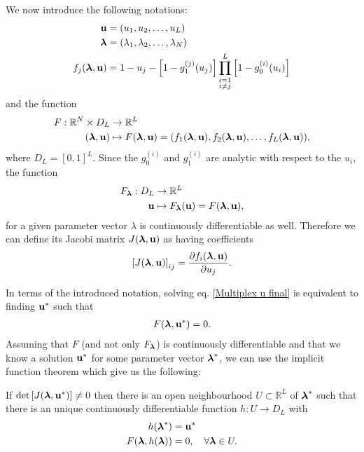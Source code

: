 \documentclass[a4paper]{article}
\begin{document}

We now introduce the following notations:
\begin{align}
	\boldsymbol{\mathrm{u}} &= (u_1, u_2, \dots, u_L) \\
	\boldsymbol{\mathrm{\lambda}} &= (\lambda_1, \lambda_2, \dots, \lambda_N) \\
	f_j(\boldsymbol{\mathrm{\lambda}}, \boldsymbol{\mathrm{u}}) &= 1 - u_j - \left[1 - g_1^{(j)}(u_j) \right] \prod_{\substack{i = 1 \\ i \neq j}}^{L}  \left[1 - g_0^{(i)}(u_i) \right] \label{Definition fj}
\end{align}
and the function
\begin{align}
	F : \mathbb{R}^N \times D_L &\rightarrow \mathbb{R}^L \\
	(\boldsymbol{\mathrm{\lambda}}, \boldsymbol{\mathrm{u}}) &\mapsto F(\boldsymbol{\mathrm{\lambda}}, \boldsymbol{\mathrm{u}}) = (f_1(\boldsymbol{\mathrm{\lambda}}, \boldsymbol{\mathrm{u}}), f_2(\boldsymbol{\mathrm{\lambda}}, \boldsymbol{\mathrm{u}}), \dots, f_L(\boldsymbol{\mathrm{\lambda}}, \boldsymbol{\mathrm{u}})), \label{Definition F}
\end{align}
where $D_L = [0, 1]^L$. Since the $g_0^{(i)}$ and $g_1^{(i)}$ are analytic with respect to the $u_i$, the function
\begin{align}
	F_{\boldsymbol{\mathrm{\lambda}}} : D_L &\rightarrow \mathbb{R}^L\\
		\boldsymbol{\mathrm{u}} &\mapsto F_{\boldsymbol{\mathrm{\lambda}}}(\boldsymbol{\mathrm{u}}) = F(\boldsymbol{\mathrm{\lambda}}, \boldsymbol{\mathrm{u}}),
\end{align}
for a given parameter vector $\lambda$ is continuously differentiable as well. Therefore we can define its Jacobi matrix $J(\boldsymbol{\mathrm{\lambda}}, \boldsymbol{\mathrm{u}})$ as having coefficients
\begin{align}
	\left[ J(\boldsymbol{\mathrm{\lambda}}, \boldsymbol{\mathrm{u}}) \right]_{ij} = \frac{\partial f_i(\boldsymbol{\mathrm{\lambda}},\boldsymbol{\mathrm{u}})}{\partial u_j}.
\end{align}

In terms of the introduced notation, solving eq. \eqref{Multiplex u final} is equivalent to finding $\boldsymbol{\mathrm{u}}^*$ such that
\begin{align}
	F(\boldsymbol{\mathrm{\lambda}}, \boldsymbol{\mathrm{u}}^*) = 0.
\end{align}
Assuming that $F$ (and not only $F_{\boldsymbol{\mathrm{\lambda}}}$) is continuously differentiable and that we know a solution $\boldsymbol{\mathrm{u}}^*$ for some parameter vector $\boldsymbol{\mathrm{\lambda}}^*$, we can use the implicit function theorem which give us the following:

If $\det\left[ J(\boldsymbol{\mathrm{\lambda}}, \boldsymbol{\mathrm{u}}^*) \right] \neq 0$ then there is an open neighbourhood $U \subset \mathbb{R}^L$ of $\boldsymbol{\mathrm{\lambda}}^*$ such that there is an unique continuously differentiable function $h : U \rightarrow D_L$ with
\begin{align}
	h(\boldsymbol{\mathrm{\lambda}}^*) &= \boldsymbol{\mathrm{u}}^* \\
	F(\boldsymbol{\mathrm{\lambda}}, h(\boldsymbol{\mathrm{\lambda}})) &= 0, \quad \forall \boldsymbol{\mathrm{\lambda}} \in U. \label{Implicit solution for F}
\end{align}
\end{document}
